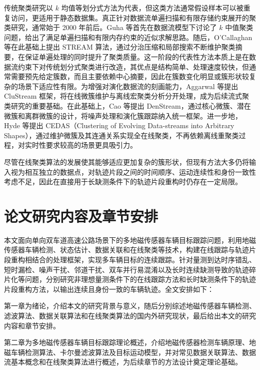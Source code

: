\documentclass{xdupgthesis}
\begin{document}
传统聚类研究以 $k$ 均值等划分式方法为代表，但这类方法通常假设样本可以被重复访问，更适用于静态数据集\cite{macqueen1967some}。真正针对数据流单遍扫描和有限存储约束展开的聚类研究，通常始于 2000 年前后。Guha 等首先在数据流模型下讨论了 $k$ 中值聚类问题，给出了满足单遍扫描和有限内存约束的近似求解思路\cite{guha2000clustering}。随后，O'Callaghan 等在此基础上提出 STREAM 算法，通过分治压缩和局部搜索不断维护聚类摘要，在保证单遍处理的同时提升了聚类质量\cite{ocallaghan2002streaming}。这一阶段的代表性方法本质上是在数据流约束下对传统划分式聚类进行改造，其优点是结构简单、处理速度较快，但通常需要预先给定簇数，而且主要依赖中心摘要，因此在簇数变化明显或簇形状较复杂的场景下适应性有限。为增强对演化数据流的刻画能力，Aggarwal 等提出 CluStream 框架，将在线微簇维护与离线宏聚类分析分开处理，成为后续流式聚类研究的重要基础\cite{aggarwal2003framework}。在此基础上，Cao 等提出 DenStream，通过核心微簇、潜在微簇和离群微簇的设计，将噪声处理和演化簇跟踪纳入统一框架\cite{cao2006denstream}。进一步地，Hyde 等提出 CEDAS（Clustering of Evolving Data-streams into Arbitrary Shapes），通过维护微簇及其连通关系实现全在线聚类，不再依赖离线重聚类过程，对实时性要求较高的场景更具吸引力\cite{hyde2017cedas}。

尽管在线聚类算法的发展使其能够适应更加复杂的簇形状，但现有方法大多仍将输入视为相互独立的数据点，对轨迹片段之间的时间顺序、运动连续性和身份一致性考虑不足，因此在直接用于长缺测条件下的轨迹片段重构时仍存在一定局限。



\section{论文研究内容及章节安排}

本文面向单向双车道高速公路场景下的多地磁传感器车辆目标跟踪问题，利用地磁传感器车辆检测、状态估计、数据关联和在线聚类等技术，构建在线跟踪与轨迹片段重构相结合的处理框架，实现多车辆目标的连续跟踪。针对量测到达时序错乱、短时漏检、噪声干扰、邻道干扰、双车并行易混淆以及长时连续缺测导致的轨迹碎片化等问题，分别研究非理想量测条件下的在线跟踪方法和长时缺测条件下的轨迹片段重构方法，以输出连续且身份一致的车辆轨迹。全文安排如下：

第一章为绪论，介绍本文的研究背景与意义，随后分别综述地磁传感器车辆检测、滤波算法、数据关联算法和在线聚类算法的国内外研究现状，最后给出本文的研究内容和章节安排。

第二章为多地磁传感器车辆目标跟踪理论概述，介绍地磁传感器检测车辆原理、地磁车辆检测算法、卡尔曼滤波算法及目标运动模型，并对常见数据关联算法、数据流基本概念和在线聚类算法进行概述，为后续章节的方法设计奠定理论基础。
\end{document}
